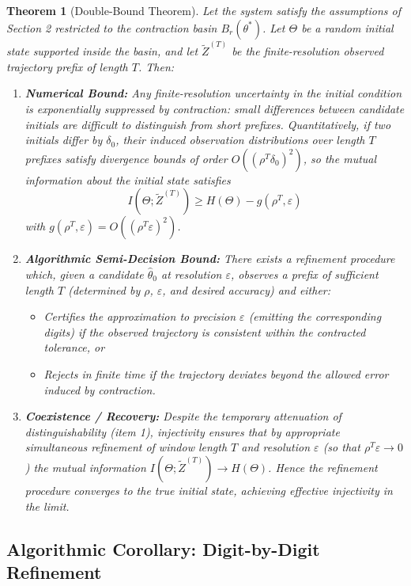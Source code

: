 \documentclass[12pt]{article}
\theoremstyle{definition}
\theoremstyle{plain}
\newtheorem{theorem}{Theorem}[section]
\begin{document}
\begin{theorem}[Double-Bound Theorem]\label{thm:double-bound}
Let the system satisfy the assumptions of Section 2 restricted to the contraction basin \(B_r(\theta^*)\). Let \(\Theta\) be a random initial state supported inside the basin, and let \(\widetilde Z^{(T)}\) be the finite-resolution observed trajectory prefix of length \(T\). Then:

\begin{enumerate}
  \item \textbf{Numerical Bound:} Any finite-resolution uncertainty in the initial condition is exponentially suppressed by contraction: small differences between candidate initials are difficult to distinguish from short prefixes. Quantitatively, if two initials differ by \(\delta_0\), their induced observation distributions over length \(T\) prefixes satisfy divergence bounds of order \(O((\rho^T \delta_0)^2)\), so the mutual information about the initial state satisfies  
  \[
  I(\Theta;\widetilde Z^{(T)}) \ge H(\Theta) - g(\rho^T,\varepsilon)
  \]
  with \(g(\rho^T,\varepsilon)=O((\rho^T\varepsilon)^2)\).  
  \item \textbf{Algorithmic Semi-Decision Bound:} There exists a refinement procedure which, given a candidate \(\widehat\theta_0\) at resolution \(\varepsilon\), observes a prefix of sufficient length \(T\) (determined by \(\rho\), \(\varepsilon\), and desired accuracy) and either:
  \begin{itemize}
    \item Certifies the approximation to precision \(\varepsilon\) (emitting the corresponding digits) if the observed trajectory is consistent within the contracted tolerance, or  
    \item Rejects in finite time if the trajectory deviates beyond the allowed error induced by contraction.  
  \end{itemize}
  \item \textbf{Coexistence / Recovery:} Despite the temporary attenuation of distinguishability (item 1), injectivity ensures that by appropriate simultaneous refinement of window length \(T\) and resolution \(\varepsilon\) (so that \(\rho^T\varepsilon\to 0\)) the mutual information \(I(\Theta;\widetilde Z^{(T)})\to H(\Theta)\). Hence the refinement procedure converges to the true initial state, achieving effective injectivity in the limit.
\end{enumerate}
\end{theorem}

\subsection{Algorithmic Corollary: Digit-by-Digit Refinement}
\end{document}
